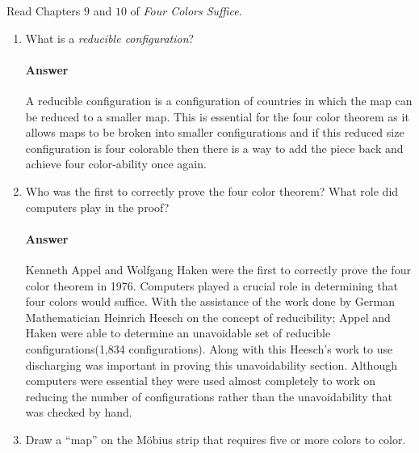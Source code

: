 \documentclass{article}
\begin{document}
 

Read Chapters $9$ and $10$ of \emph{Four Colors Suffice}.

\begin{enumerate}

    \item What is a \emph{reducible configuration}?

        \paragraph{Answer}

        A reducible configuration is a configuration of countries in which the map
        can be reduced to a smaller map. This is essential for the four color
        theorem as it allows maps to be broken into smaller configurations and if this
        reduced size configuration is four colorable then there is a way to add the piece
        back and achieve four color-ability once again.



    \item Who was the first to correctly prove the four color theorem?  What
        role did computers play in the proof?

        \paragraph{Answer}

        Kenneth Appel and Wolfgang Haken were the first to correctly prove the
        four color theorem in 1976. Computers played a crucial role in determining that
        four colors would suffice. With the assistance of the work done by German Mathematician
        Heinrich Heesch on the concept of reducibility; Appel and Haken were able to determine
        an unavoidable set of reducible configurations(1,834 configurations). Along with this
        Heesch's work to use discharging was important in proving this unavoidability section.
        Although computers were essential they were used almost completely to work on reducing
        the number of configurations rather than the unavoidability that was checked by hand.



    \item Draw a ``map'' on the M\"obius strip that requires five or more colors
        to color.


\end{enumerate}
\end{document}
